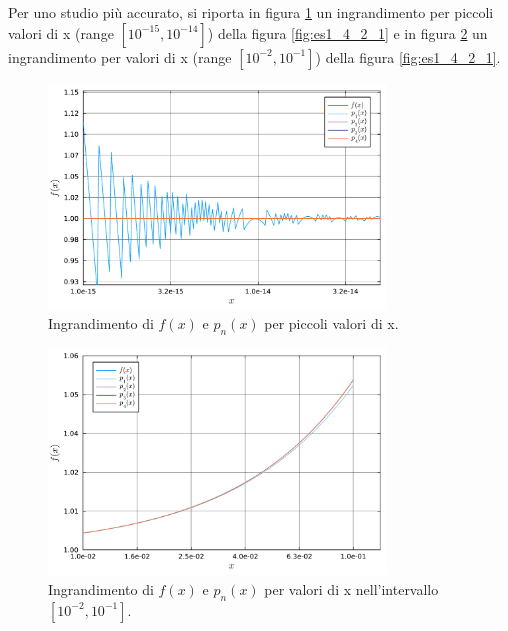 \documentclass[letterpaper, 12pt]{article}
\begin{document}
Per uno studio più accurato, si riporta in figura \ref{fig:es1_4_2_2} un ingrandimento per piccoli valori di x 
(range $[10^{-15}, 10^{-14}]$) della figura \ref{fig:es1_4_2_1} e in figura \ref{fig:es1_4_2_3} un ingrandimento 
per valori di x (range $[10^{-2}, 10^{-1}]$) della figura \ref{fig:es1_4_2_1}.
\begin{figure}[ht!]
    \centering
    \includegraphics[width=0.8\textwidth]{1422.pdf}
    \caption{Ingrandimento di $f(x)$ e $p_n(x)$ per piccoli valori di x.}
    \label{fig:es1_4_2_2}
\end{figure}
\begin{figure}[ht!]
    \centering
    \includegraphics[width=0.8\textwidth]{1423.pdf}
    \caption{Ingrandimento di $f(x)$ e $p_n(x)$ per valori di x nell'intervallo $[10^{-2}, 10^{-1}]$.}
    \label{fig:es1_4_2_3}
\end{figure}
\end{document}
